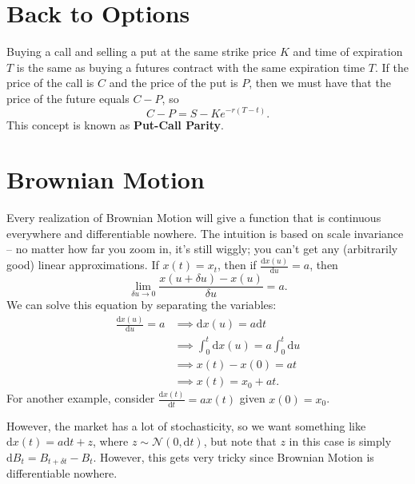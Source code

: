 \section{Back to Options}
Buying a call and selling a put at the same strike price $K$ and time of expiration $T$ is the same as buying a futures contract with the same expiration time $T$. If the price of the call is $C$ and the price of the put is $P$, then we must have that the price of the future equals $C-P$, so $$ C-P = S-K e^{-r(T-t)}. $$ This concept is known as \textbf{Put-Call Parity}.

\section{Brownian Motion}
Every realization of Brownian Motion will give a function that is continuous everywhere and differentiable nowhere. The intuition is based on scale invariance -- no matter how far you zoom in, it's still wiggly; you can't get any (arbitrarily good) linear approximations. If $x(t)=x_t$, then if $\frac{\mathrm dx(u)}{\mathrm du} = a$, then $$\lim_{\delta u\to 0}\frac{x(u+\delta u)-x(u)}{\delta u} = a.$$ We can solve this equation by separating the variables: \begin{align*}
	\frac{\mathrm dx(u)}{\mathrm du} = a &\implies \mathrm dx(u) = a\mathrm dt \\
										 &\implies \int_0^t \mathrm dx(u) = a\int_0^t\mathrm du \\
										 &\implies x(t) - x(0) = at \\
										 &\implies x(t) = x_0 + at.
\end{align*} For another example, consider $\frac{\mathrm dx(t)}{\mathrm dt} = ax(t)$ given $x(0)=x_0$.

However, the market has a lot of stochasticity, so we want something like $\mathrm dx(t) = a\mathrm dt + z$, where $z\sim\mathcal N(0,\mathrm dt)$, but note that $z$ in this case is simply $\mathrm dB_t=B_{t+\delta t}-B_{t}$. However, this gets very tricky since Brownian Motion is differentiable nowhere.

